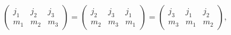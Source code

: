 \[\begin{pmatrix}j_{1}&j_{2}&j_{3}\\
m_{1}&m_{2}&m_{3}\end{pmatrix}=\begin{pmatrix}j_{2}&j_{3}&j_{1}\\
m_{2}&m_{3}&m_{1}\end{pmatrix}=\begin{pmatrix}j_{3}&j_{1}&j_{2}\\
m_{3}&m_{1}&m_{2}\end{pmatrix},\]